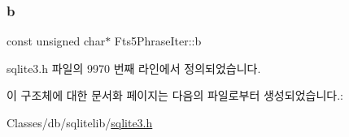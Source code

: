 \subsubsection{\texorpdfstring{b}{b}}
{\footnotesize\ttfamily const unsigned char$\ast$ Fts5\+Phrase\+Iter\+::b}



sqlite3.\+h 파일의 9970 번째 라인에서 정의되었습니다.



이 구조체에 대한 문서화 페이지는 다음의 파일로부터 생성되었습니다.\+:\begin{DoxyCompactItemize}
\item 
Classes/db/sqlitelib/\hyperlink{sqlite3_8h}{sqlite3.\+h}\end{DoxyCompactItemize}
